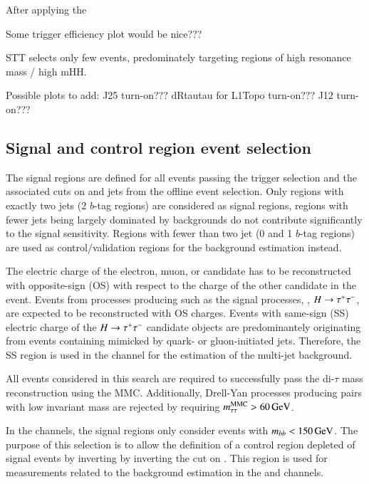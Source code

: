 After applying the

Some trigger efficiency plot would be nice???

STT selects only few events, predominately targeting regions of high resonance mass / high mHH.

Possible plots to add:
J25 turn-on???
dRtautau for L1Topo turn-on???
J12 turn-on???

\subsection{Signal and control region event selection}%
\label{sec:sr_and_cr_selection}

The signal regions are defined for all events passing the trigger
selection and the associated cuts on \tauhadvis and jets from the
offline event selection. Only regions with exactly two \btagged jets
(2 $b$-tag regions) are considered as signal regions, regions with
fewer \btagged jets being largely dominated by backgrounds do not
contribute significantly to the signal sensitivity. Regions with fewer
than two \btagged jet (0 and 1 $b$-tag regions) are used as
control/validation regions for the background estimation instead.

The electric charge of the electron, muon, or \tauhadvis candidate has
to be reconstructed with opposite-sign (OS) with respect to the charge
of the other \tauhadvis candidate in the event. Events from processes
producing \tauleptons such as the signal processes, \Zjets,
$H \to \tau^{+} \tau^{-}$, \ttbar are expected to be reconstructed with OS
charges. Events with same-sign (SS) electric charge of the
$H \to \tau^{+} \tau^{-}$ candidate objects are predominantely originating from
events containing \tauhadvis mimicked by quark- or gluon-initiated
jets. Therefore, the SS region is used in the \hadhad channel for the
estimation of the multi-jet background.

All events considered in this search are required to successfully pass
the di-$\tau$ mass reconstruction using the MMC. Additionally,
Drell-Yan processes producing \taulepton pairs with low invariant mass
are rejected by requiring $m_{\tau\tau}^\text{MMC} > \SI{60}{\ensuremath{\text{GeV}}}$.

In the \lephad channels, the signal regions only consider events with
$m_{bb} < \SI{150}{\ensuremath{\text{GeV}}}$. The purpose of this selection is to allow the
definition of a \ttbar control region depleted of signal events by
inverting by inverting the cut on \mBB. This region is used for
measurements related to the \faketauhadvis background estimation in
the \lephad and \hadhad channels.

